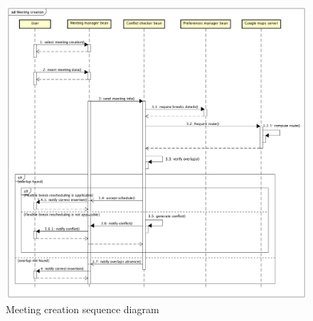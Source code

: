 \begin{figure}
	\centering
	\includegraphics[width=1.3\textwidth]{images/meetingcreation}
	\caption{Meeting creation sequence diagram}
	\label{fig:meetingcreation}
\end{figure}

